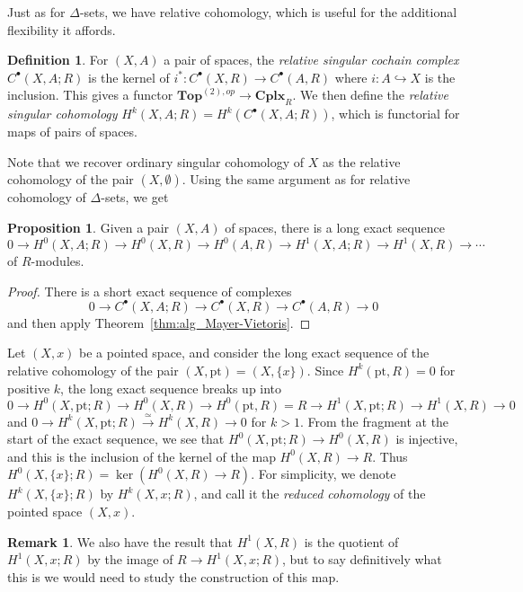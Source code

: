 \documentclass{tufte-handout}
\def\into {\hookrightarrow}
\def\pt {\mathrm{pt}}
\def\Top {\mathbf{Top}}
\def\Cplx{\mathbf{Cplx}}
\theoremstyle{definition}
\newtheorem{prop}{Proposition}
\newtheorem{definition}{Definition}
\newtheorem*{rem}{Remark}
\begin{document}
Just as for $\Delta$-sets, we have relative cohomology, which is useful for the additional flexibility
it affords.

\begin{definition}
For $(X,A)$ a pair of spaces, the \emph{relative singular cochain complex} $C^\bullet(X,A;R)$ is the kernel of $i^*\colon C^\bullet(X,R) \to C^\bullet(A,R)$
where $i\colon A\into X$ is the inclusion. This gives a functor $\Top^{(2),op}\to \Cplx_R$. We then define the \emph{relative singular cohomology}
$H^k(X,A;R) = H^k(C^\bullet(X,A;R))$, which is functorial for maps of pairs of spaces.
\end{definition}

Note that we recover ordinary singular cohomology of $X$ as the relative cohomology of the pair 
$(X,\emptyset)$. Using the same argument as for relative cohomology of $\Delta$-sets, we get

\begin{prop}
Given a pair $(X,A)$ of spaces, there is a long exact sequence
\[
0\to H^0(X,A;R) \to H^0(X,R) \to H^0(A,R) \to H^1(X,A;R) \to H^1(X,R) \to \cdots
\]
of $R$-modules.
\end{prop}

\begin{proof}
There is a short exact sequence of complexes
\[
	0\to C^\bullet(X,A;R) \to C^\bullet(X,R)\to C^\bullet(A,R) \to 0
\]
and then apply Theorem~\ref{thm:alg_Mayer-Vietoris}.
\end{proof}

Let $(X,x)$ be a pointed space, and consider the long exact sequence of the relative cohomology of
 the pair $(X,\pt) = (X,\{x\})$. Since $H^k(\pt,R) = 0$ for positive $k$, the long exact sequence breaks up into
\[
0\to H^0(X,\pt;R) \to H^0(X,R) \to H^0(\pt,R) = R \to H^1(X,\pt;R) \to H^1(X,R) \to 0
\]
and $0\to H^k(X,\pt;R) \xrightarrow{\simeq} H^k(X,R) \to 0$ for $k>1$. From the fragment at the 
start of the exact sequence, we see that $H^0(X,\pt;R) \to H^0(X,R)$ is injective, and this is the 
inclusion of the kernel of the map $H^0(X,R) \to R$. Thus $H^0(X,\{x\};R) = \ker(H^0(X,R) \to R)$.
For simplicity, we denote $H^k(X,\{x\};R)$ by $H^k(X,x;R)$, and call it the \emph{reduced cohomology}
of the pointed space $(X,x)$.


\begin{rem}
We also have the result that $H^1(X,R)$ is the quotient of $H^1(X,x;R)$ by the image of 
$R\to H^1(X,x;R)$, but to say definitively what this is we would need to study the construction
of this map. 
\end{rem}
\end{document}
